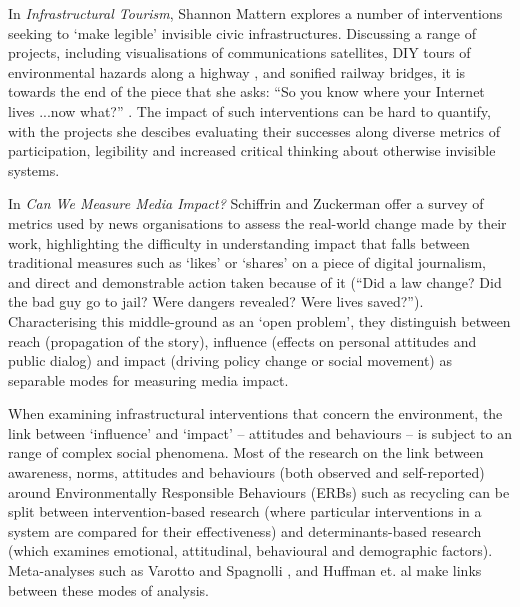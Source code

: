 \documentclass[nofonts,nols,justified,nobib]{tufte-book}
\begin{document}
In \emph{Infrastructural Tourism}, Shannon Mattern explores a number of interventions seeking to `make legible' invisible civic infrastructures. Discussing a range of projects, including visualisations of communications satellites, DIY tours of environmental hazards along a highway \cite{balkin_invisible5_2006}, and sonified railway bridges, it is towards the end of the piece that she asks: ``So you know where your Internet lives ...now what?'' \cite{mattern_infrastructural_2013}. The impact of such interventions can be hard to quantify, with the projects she descibes evaluating their successes along diverse metrics of participation, legibility and increased critical thinking about otherwise invisible systems. 

In \emph{Can We Measure Media Impact?} Schiffrin and Zuckerman offer a survey of metrics used by news organisations to assess the real-world change made by their work, highlighting the difficulty in understanding impact that falls between traditional measures such as `likes' or `shares' on a piece of digital journalism, and direct and demonstrable action taken because of it (``Did a law change? Did the bad guy go to jail? Were dangers revealed? Were lives saved?''). Characterising this middle-ground as an `open problem', they distinguish between reach (propagation of the story), influence (effects on personal attitudes and public dialog) and impact (driving policy change or social movement) as separable modes for measuring media impact. \cite{anya_schiffrin_can_2015}

When examining infrastructural interventions that concern the environment, the link between `influence' and `impact' -- attitudes and behaviours -- is subject to an range of complex social phenomena. Most of the research on the link between awareness, norms, attitudes and behaviours (both observed and self-reported) around Environmentally Responsible Behaviours (ERBs) such as recycling can be split between intervention-based research (where particular interventions in a system are compared for their effectiveness) and determinants-based research (which examines emotional, attitudinal, behavioural and demographic factors). Meta-analyses such as Varotto and Spagnolli \cite{varotto_psychological_2017}, and Huffman et. al \cite{huffman_when_2014} make links between these modes of analysis.
\end{document}
